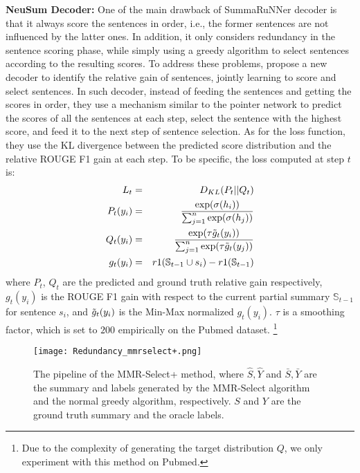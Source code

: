 \documentclass[11pt,a4paper]{article}
\begin{document}
\textbf{NeuSum Decoder:} 
One of the main drawback of SummaRuNNer decoder is that it always score the sentences in order, i.e., the former sentences are not influenced by the latter ones. In addition, it only considers redundancy in the sentence scoring phase, while simply using a greedy algorithm to select sentences according to the resulting scores. To address these problems,  propose a new decoder to identify the relative gain of sentences, jointly learning to score and select sentences. In such decoder, instead of feeding the sentences and getting the scores in order, they use a mechanism similar to the pointer network \cite{pointer_network} to 
predict the scores of all the sentences at each step, select the sentence with the highest score, and feed it to the next step of sentence selection. As for the loss function, they use the KL divergence between the predicted score distribution and the relative ROUGE F1 gain at each step. 
To be specific, the loss computed at step $t$ is: \vspace{-2mm}
\begin{eqnarray*}
L_t &=& D_{KL}(P_t||Q_t)\\
P_t(y_i) &=&\frac{\exp(\sigma(h_i))}{\sum_{j=1}^n{\exp(\sigma(h_j))}}\\
Q_t(y_i) &=& \frac{\exp(\tau \Tilde{g}_t(y_i))}{\sum_{j=1}^n{\exp(\tau \Tilde{g}_t(y_j))}}\\
g_t(y_i) &=& r1(\mathbb{S}_{t-1}\cup s_i)-r1(\mathbb{S}_{t-1})
\end{eqnarray*}
where $P_t$, $Q_t$ are the predicted and ground truth relative gain respectively, $g_t(y_i)$ is the ROUGE F1 gain with respect to the current partial summary $\mathbb{S}_{t-1}$ for sentence $s_i$, and $\Tilde{g}_t(y_i)$ is the Min-Max normalized $g_t(y_i)$. $\tau$ is a smoothing factor, which is set to $200$ empirically on the Pubmed dataset. \footnote{Due to the complexity of generating the target distribution $Q$, we only experiment with this method on Pubmed.}

\begin{figure*}[h!]
    \centering
    \texttt{[image: Redundancy\_mmrselect+.png]}
    \caption{The pipeline of the MMR-Select+ method, where $\hat{S},\hat{Y}$ and $\bar{S},\bar{Y}$  are the summary and labels generated by the MMR-Select algorithm and the normal greedy algorithm, respectively. $S$ and $Y$ are the ground truth summary and the oracle labels.}
    \label{fig:mmr-rl}
    \vspace{-2mm}
\end{figure*}
\vspace{-1mm}
\end{document}

